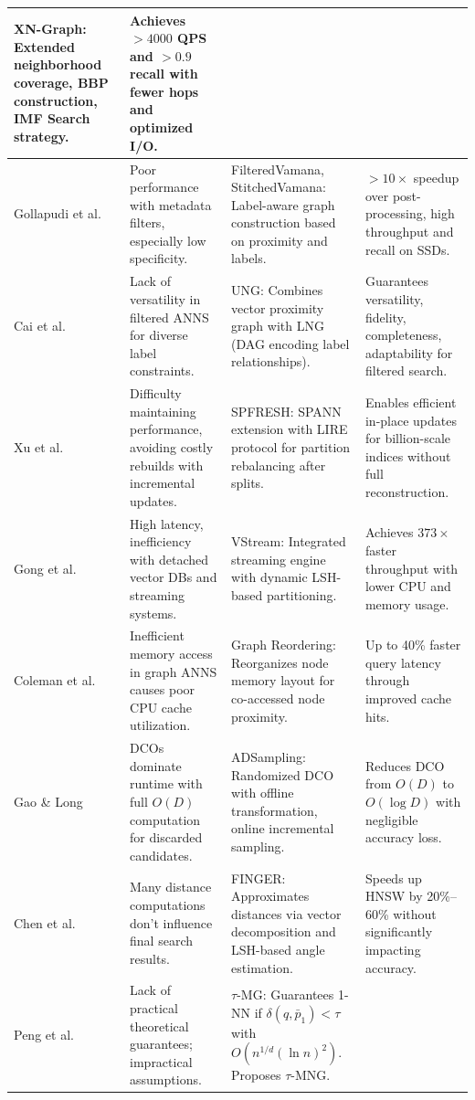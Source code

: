 \documentclass[conference]{IEEEtran}
\begin{document}
\begin{table}[t]
\begin{tabularx}{\textwidth}{
    >{\RaggedRight}p{} 
    >{\RaggedRight}p{} 
    >{\RaggedRight}p{} 
    >{\RaggedRight\arraybackslash}X
}
XN-Graph: Extended neighborhood coverage, BBP construction, IMF Search strategy. & 
Achieves $>4000$ QPS and $>0.9$ recall with fewer hops and optimized I/O. \\
\midrule
Gollapudi et al. \cite{gollapudi2023} & 
Poor performance with metadata filters, especially low specificity. & 
FilteredVamana, StitchedVamana: Label-aware graph construction based on proximity and labels. & 
$>10\times$ speedup over post-processing, high throughput and recall on SSDs. \\
\midrule
Cai et al. \cite{cai2024} & 
Lack of versatility in filtered ANNS for diverse label constraints. & 
UNG: Combines vector proximity graph with LNG (DAG encoding label relationships). & 
Guarantees versatility, fidelity, completeness, adaptability for filtered search. \\
\midrule
Xu et al. \cite{xu2023} & 
Difficulty maintaining performance, avoiding costly rebuilds with incremental updates. & 
SPFRESH: SPANN extension with LIRE protocol for partition rebalancing after splits. & 
Enables efficient in-place updates for billion-scale indices without full reconstruction. \\
\midrule
Gong et al. \cite{gong2025} & 
High latency, inefficiency with detached vector DBs and streaming systems. & 
VStream: Integrated streaming engine with dynamic LSH-based partitioning. & 
Achieves $373\times$ faster throughput with lower CPU and memory usage. \\
\midrule
Coleman et al. \cite{coleman2022} & 
Inefficient memory access in graph ANNS causes poor CPU cache utilization. & 
Graph Reordering: Reorganizes node memory layout for co-accessed node proximity. & 
Up to 40\% faster query latency through improved cache hits. \\
\midrule
Gao \& Long \cite{gao2023} & 
DCOs dominate runtime with full $O(D)$ computation for discarded candidates. & 
ADSampling: Randomized DCO with offline transformation, online incremental sampling. & 
Reduces DCO from $O(D)$ to $O(\log D)$ with negligible accuracy loss. \\
\midrule
Chen et al. \cite{chen2023} & 
Many distance computations don't influence final search results. & 
FINGER: Approximates distances via vector decomposition and LSH-based angle estimation. & 
Speeds up HNSW by 20\%--60\% without significantly impacting accuracy. \\
\midrule
Peng et al. \cite{peng2023} & 
Lack of practical theoretical guarantees; impractical assumptions. & 
$\tau$-MG: Guarantees 1-NN if $\delta(q,\bar{p}_1) < \tau$ with $O(n^{1/d}(\ln n)^2)$. Proposes $\tau$-MNG. & 

\end{tabularx}
\end{table}
\end{document}
